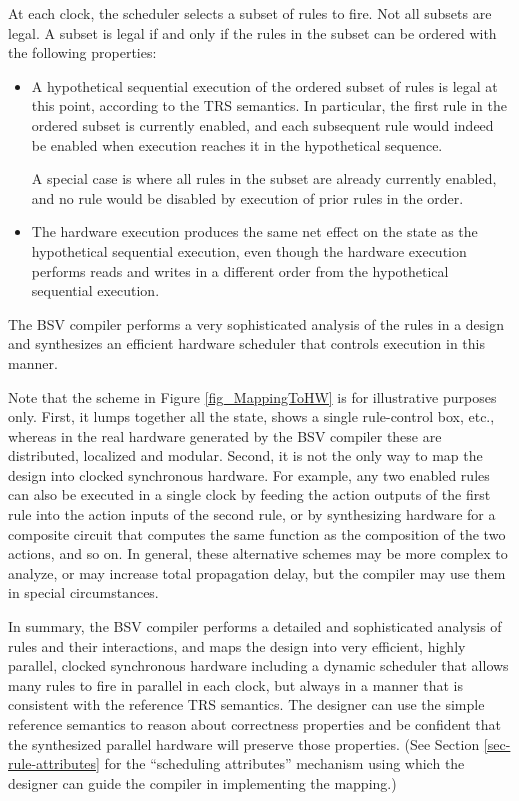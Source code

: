 \documentclass[twoside,letterpaper]{article}
\newcommand{\BSV}{BSV}
\begin{document}
At each clock, the scheduler selects a subset of rules to fire.  Not
all subsets are legal.  A subset is legal if and only if the rules in
the subset can be ordered with the following properties:
\begin{itemize}
\item
A hypothetical sequential execution of the ordered subset of rules is
legal at this point, according to the TRS semantics.  In particular,
the first rule in the ordered subset is currently enabled, and each
subsequent rule would indeed be enabled when execution reaches it in
the hypothetical sequence.

A special case is where all rules in the subset are already currently
enabled, and no rule would be disabled by execution of prior rules in
the order.

\item
The hardware execution produces the same net effect on the state as
the hypothetical sequential execution, even though the hardware
execution performs reads and writes in a different order from the
hypothetical sequential execution.

\end{itemize}
The {\BSV} compiler performs a very sophisticated analysis of the
rules in a design and synthesizes an efficient hardware scheduler that
controls execution in this manner.

Note that the scheme in Figure \ref{fig_MappingToHW} is for
illustrative purposes only.  First, it lumps together all the state,
shows a single rule-control box, etc., whereas in the real hardware
generated by the {\BSV} compiler these are distributed, localized and
modular.  Second, it is not the only way to map the design into
clocked synchronous hardware.  For example, any two enabled rules can
also be executed in a single clock by feeding the action outputs of
the first rule into the action inputs of the second rule, or by
synthesizing hardware for a composite circuit that computes the same
function as the composition of the two actions, and so on.  In
general, these alternative schemes may be more complex to analyze, or
may increase total propagation delay, but the compiler may use them in
special circumstances.

In summary, the {\BSV} compiler performs a detailed and sophisticated
analysis of rules and their interactions, and maps the design into
very efficient, highly parallel, clocked synchronous hardware
including a dynamic scheduler that allows many rules to fire in
parallel in each clock, but always in a manner that is consistent with
the reference TRS semantics.  The designer can use the simple
reference semantics to reason about correctness properties and be
confident that the synthesized parallel hardware will preserve those
properties. (See Section \ref{sec-rule-attributes} for the
``scheduling attributes'' mechanism using which the designer can guide
the compiler in implementing the mapping.)
\end{document}
